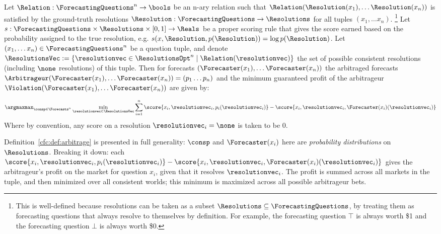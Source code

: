\begin{definition}
    Let $\Relation:\ForecastingQuestions^n\to\bools$ be an n-ary relation such that $\Relation(\Resolution(x_1), \dots \Resolution(x_n))$ is satisfied by the ground-truth resolutions $\Resolution:\ForecastingQuestions\to\Resolutions$ for all tuples $(x_1,\dots x_n)$. \footnote{This is well-defined because resolutions can be taken as a subset $\Resolutions\subseteq\ForecastingQuestions$, by treating them as forecasting questions that always resolve to themselves by definition. For example, the forecasting question $\top$ is always worth \$1 and the forecasting question $\bot$ is always worth \$0.} Let $s:\ForecastingQuestions\times\Resolutions\times[0,1]\to\Reals$ be a proper scoring rule that gives the score earned based on the probability assigned to the true resolution, e.g. $s(x,\Resolution,p(\Resolution))=\log p(\Resolution)$. Let $(x_1,\dots x_n)\in\ForecastingQuestions^n$ be a question tuple, and denote $\ResolutionsVec:=\{\resolutionvec\in\ResolutionsOpt^n\mid\Relation(\resolutionvec)\}$ the set of possible consistent resolutions (including $\none$ resolutions) of this tuple. Then for forecasts $(\Forecaster(x_1),\dots\Forecaster(x_n))$ the arbitraged forecasts $\Arbitrageur(\Forecaster(x_1),\dots\Forecaster(x_n))=(p_1\dots p_n)$ and the minimum guaranteed profit of the arbitrageur $\Violation(\Forecaster(x_1),\dots\Forecaster(x_n))$ are given by:

    \begin{equation}
        \argmaxmax_{\consp\in\Forecasts^n}
        \min_{\resolutionvec\in\ResolutionsVec}
        \sum_{i=1}^n
        \score{x_i, \resolutionvec_i, p_i(\resolutionvec_i)}
        - \score{x_i, \resolutionvec_i, \Forecaster(x_i)(\resolutionvec_i)}
        \label{cfc:eq:arbitrage}
    \end{equation}
    Where by convention, any score on a resolution $\resolutionvec_i=\none$ is taken to be 0.
    \label{cfc:def:arbitrage}
\end{definition}

Definition~\ref{cfc:def:arbitrage} is presented in full generality: $\consp$ and $\Forecaster(x_i)$ here are \emph{probability distributions} on $\Resolutions$. Breaking it down: each $\score{x_i, \resolutionvec_i, p_i(\resolutionvec_i)}- \score{x_i, \resolutionvec_i, \Forecaster(x_i)(\resolutionvec_i)}$ gives the arbitrageur's profit on the market for question $x_i$, given that it resolves $\resolutionvec_i$. The profit is summed across all markets in the tuple, and then minimized over all consistent worlds; this minimum is maximized across all possible arbitrageur bets.

